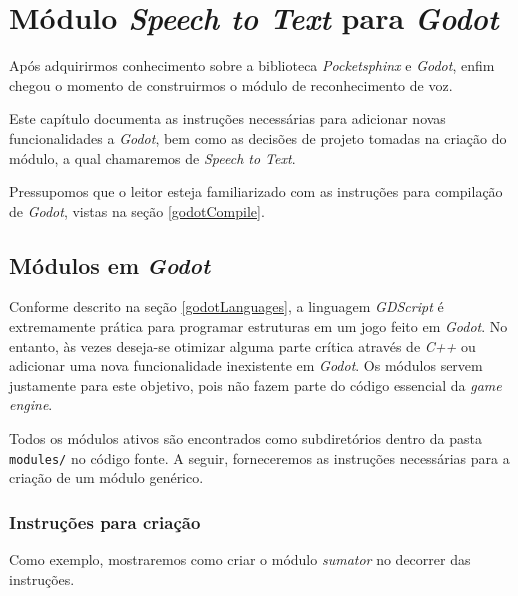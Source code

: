 \chapter{Módulo \textit{Speech to Text} para \textit{Godot}}
\label{cap:stt-module}

Após adquirirmos conhecimento sobre a biblioteca \textit{Pocketsphinx} e \textit{Godot}, enfim chegou o momento de construirmos o módulo de reconhecimento de voz.

Este capítulo documenta as instruções necessárias para adicionar novas funcionalidades a \textit{Godot}, bem como as decisões de projeto tomadas na criação do módulo, a qual chamaremos de \textit{Speech to Text}.

Pressupomos que o leitor esteja familiarizado com as instruções para compilação de \textit{Godot}, vistas na seção \ref{godotCompile}.


\section{Módulos em \textit{Godot}}

Conforme descrito na seção \ref{godotLanguages}, a linguagem \textit{GDScript} é extremamente prática para programar estruturas em um jogo feito em \textit{Godot}. No entanto, às vezes deseja-se otimizar alguma parte crítica através de \textit{C++} ou adicionar uma nova funcionalidade inexistente em \textit{Godot}. Os módulos servem justamente para este objetivo, pois não fazem parte do código essencial da \textit{game engine}.

Todos os módulos ativos são encontrados como subdiretórios dentro da pasta \texttt{modules/} no código fonte. A seguir, forneceremos as instruções necessárias para a criação de um módulo genérico.


\subsection{Instruções para criação}

Como exemplo, mostraremos como criar o módulo \textit{sumator} no decorrer das instruções.

